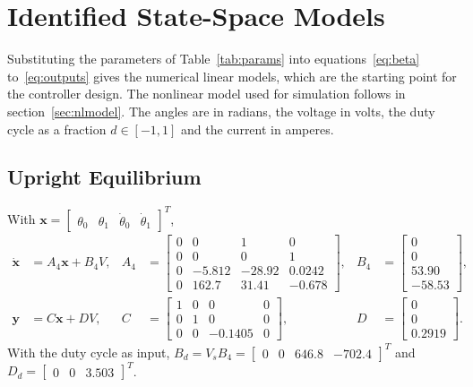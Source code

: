 \documentclass[a4paper,11pt]{article}
\begin{document}
\section{Identified State-Space Models}
\label{sec:ssmodels}
Substituting the parameters of Table~\ref{tab:params} into equations~\ref{eq:beta} to~\ref{eq:outputs} gives the numerical linear models, which are the starting point for the controller design. The nonlinear model used for simulation follows in section~\ref{sec:nlmodel}. The angles are in radians, the voltage in volts, the duty cycle as a fraction $d \in [-1, 1]$ and the current in amperes.

\subsection{Upright Equilibrium}
With $\mathbf{x} = \begin{bmatrix} \theta_0 & \theta_1 & \dot\theta_0 & \dot\theta_1 \end{bmatrix}^T$,
\begin{equation}
\boxed{
\begin{aligned}
  \dot{\mathbf{x}} &= A_4 \mathbf{x} + B_4 V, &
  A_4 &= \begin{bmatrix}
  0 & 0 & 1 & 0\\
  0 & 0 & 0 & 1\\
  0 & -5.812 & -28.92 & 0.0242\\
  0 & 162.7 & 31.41 & -0.678
  \end{bmatrix}, &
  B_4 &= \begin{bmatrix} 0 \\ 0 \\ 53.90 \\ -58.53 \end{bmatrix},\\[4pt]
  \mathbf{y} &= C\mathbf{x} + D V, &
  C &= \begin{bmatrix} 1 & 0 & 0 & 0 \\ 0 & 1 & 0 & 0 \\ 0 & 0 & -0.1405 & 0 \end{bmatrix}, &
  D &= \begin{bmatrix} 0 \\ 0 \\ 0.2919 \end{bmatrix}.
\end{aligned}
}
\label{eq:ss_up_num}
\end{equation}
With the duty cycle as input, $B_d = V_s B_4 = \begin{bmatrix} 0 & 0 & 646.8 & -702.4 \end{bmatrix}^T$ and $D_d = \begin{bmatrix} 0 & 0 & 3.503 \end{bmatrix}^T$.
\end{document}
